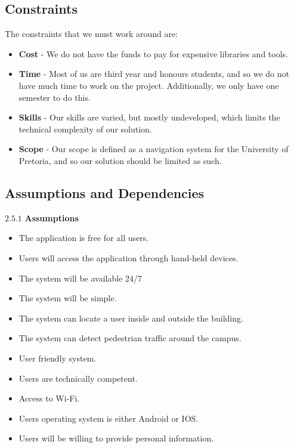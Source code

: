 \documentclass[english]{article}
\begin{document}
		\subsection{Constraints}
                The constraints that we must work around are:
			    \begin{itemize}
			        \item \textbf{Cost} - We do not have the funds to pay for expensive libraries and tools.
			        \item \textbf{Time} - Most of us are third year and honours students, and so we do not have much time to work on the project. Additionally, we only have one semester to do this.
			        \item \textbf{Skills} - Our skills are varied, but mostly undeveloped, which limits the technical complexity of our solution.
			        \item \textbf{Scope} - Our scope is defined as a navigation system for the University of Pretoria, and so our solution should be limited as such.
			    \end{itemize}

		\subsection{Assumptions and Dependencies}
				\begin{large}$2.5.1 $ \textbf{Assumptions}\end{large}
	\begin{itemize}
		\item The application is free for all users.
		\item Users will access the application through hand-held devices.
		\item The system will be available 24/7
		\item The system will be simple.
		\item The system can locate a user inside and outside the building.
		\item The system can detect pedestrian traffic around the campus.
		\item User friendly system.
		\item Users are technically competent.
		\item Access to Wi-Fi.
		\item Users operating system is either Android or IOS.
		\item Users will be willing to provide personal information.

\end{itemize}
\end{document}
